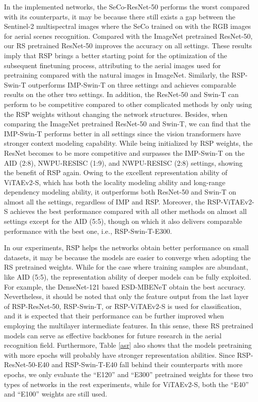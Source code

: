 \documentclass[10pt, journal,twoside]{IEEEtran}
\begin{document}
In the implemented networks, the SeCo-ResNet-50 performs the worst compared with its counterparts, it may be because there still exists a gap between the Sentinel-2 multispectral images where the SeCo trained on with the RGB images for aerial scenes recognition. Compared with the ImageNet pretrained ResNet-50, our RS pretrained ResNet-50 improves the accuracy on all settings. These results imply that RSP brings a better starting point for the optimization of the subsequent finetuning process, attributing to the aerial images used for pretraining compared with the natural images in ImageNet. Similarly, the RSP-Swin-T outperforms IMP-Swin-T on three settings and achieves comparable results on the other two settings. In addition, the ResNet-50 and Swin-T can perform to be competitive compared to other complicated methods by only using the RSP weights without changing the network structures. Besides, when comparing the ImageNet pretrained ResNet-50 and Swin-T, we can find that the IMP-Swin-T performs better in all settings since the vision transformers have stronger context modeling capability. While being initialized by RSP weights, the ResNet becomes to be more competitive and surpasses the IMP-Swin-T on the AID (2:8), NWPU-RESISC (1:9), and NWPU-RESISC (2:8) settings, showing the benefit of RSP again. Owing to the excellent representation ability of ViTAEv2-S, which has both the locality modeling ability and long-range dependency modeling ability, it outperforms both ResNet-50 and Swin-T on almost all the settings, regardless of IMP and RSP. Moreover, the RSP-ViTAEv2-S achieves the best performance compared with all other methods on almost all settings except for the AID (5:5), though on which it also delivers comparable performance with the best one, i.e., RSP-Swin-T-E300. 

In our experiments, RSP helps the networks obtain better performance on small datasets, it may be because the models are easier to converge when adopting the RS pretrained weights. While for the case where training samples are abundant, like AID (5:5), the representation ability of deeper models can be fully exploited. For example, the DenseNet-121 based ESD-MBENeT obtain the best accuracy. Nevertheless, it should be noted that only the feature output from the last layer of RSP-ResNet-50, RSP-Swin-T, or RSP-ViTAEv2-S is used for classification, and it is expected that their performance can be further improved when employing the multilayer intermediate features. In this sense, these RS pretrained models can serve as effective backbones for future research in the aerial recognition field. Furthermore, Table \ref{asr} also shows that the models pretraining with more epochs will probably have stronger representation abilities. Since RSP-ResNet-50-E40 and RSP-Swin-T-E40 fall behind their counterparts with more epochs, we only evaluate the ``E120'' and ``E300'' pretrained weights for these two types of networks in the rest experiments, while for ViTAEv2-S, both the ``E40'' and ``E100'' weights are still used.
\end{document}
